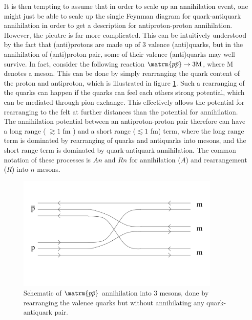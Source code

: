 It is then tempting to assume that in order to scale up an annihilation event, one might just be able to scale up the single Feynman diagram for quark-antiquark annihilation in order to get a description for antiproton-proton annihilation. However, the picutre is far more complicated. This can be intuitively understood by the fact that (anti)protons are made up of 3 valence (anti)quarks, but in the annihilation of (anti)proton pair, some of their valence (anti)quarks may well survive. In fact, consider the following reaction $\matrm{p\bar{p}} \rightarrow 3 \mathrm{M}$, where M denotes a meson. This can be done by simply rearranging the quark content of the proton and antiproton, which is illustrated in figure \ref{fig:Quark_Rearrangement}. Such a rearranging of the quarks can happen if the quarks can feel each others strong potential, which can be mediated through pion exchange. This effectively allows the potential for rearranging to the felt at further distances than the potential for annihilation. The annihilation potential between an antiproton-proton pair therefore can have a long range ( $\gtrsim 1$ fm ) and a short range ($\lesssim 1$ fm) term, where the long range term is dominated by rearranging of quarks and antiquarks into mesons, and the short range term is dominated by quark-antiquark annihilation. The common notation of these processes is $An$ and $Rn$ for annihilation ($A$) and rearrangement ($R$) into $n$ mesons.\\

\begin{figure}[h!]
    \centering
    \includegraphics[width=0.9\textwidth]{figures/quark_rearrangment.pdf}
    \caption{Schematic of $\matrm{p\bar{p}}$ annihilation into 3 mesons, done by rearranging the valence quarks but without annihilating any quark-antiquark pair.}
    \label{fig:Quark_Rearrangement}
\end{figure}

